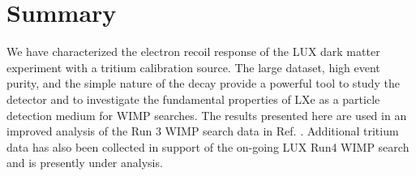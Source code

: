 \section{Summary}

We have characterized the electron recoil response of the LUX dark matter experiment with a tritium calibration source. The large dataset, high event purity, and the simple nature of the decay provide a powerful tool to study the detector and to investigate the fundamental properties of LXe as a particle detection medium for WIMP searches. The results presented here are used in an improved analysis of the Run 3 WIMP search data in Ref. \cite{lux-reanalysis}. Additional tritium data has also been collected in support of the on-going LUX Run4 WIMP search and is presently under analysis.